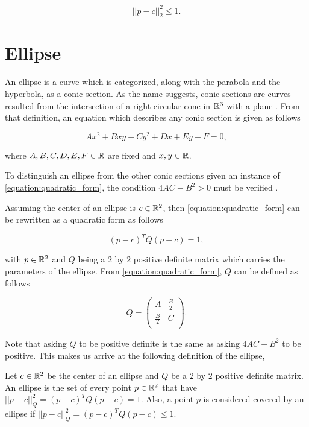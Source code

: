 \begin{equation}\label{eq:disk}
||p-c||_2^2 \le 1.
\end{equation} 

\section{Ellipse}

An ellipse is a curve which is categorized, along with the parabola and the hyperbola, as a conic section. As the name suggests, conic sections are curves resulted from the intersection of a right circular cone in $\mathbb{R}^3$ with a plane \cite{brannan:geometry}. From that definition, an equation which describes any conic section is given as follows

\begin{equation}\label{equation:quadratic_form}
Ax^2 + Bxy + Cy^2 + Dx + Ey + F = 0,
\end{equation}

\noindent where $A,B,C,D,E,F \in \mathbb{R}$ are fixed and $x, y \in \mathbb{R}$.

To distinguish an ellipse from the other conic sections given an instance of \autoref{equation:quadratic_form}, the condition $4AC - B^2>0$ must be verified \cite{ayoub}.

Assuming the center of an ellipse is $c \in \mathbb{R}^2$, then \autoref{equation:quadratic_form} can be rewritten as a quadratic form as follows

\begin{equation}
(p-c)^{T}Q(p-c) = 1,
\end{equation}

\noindent with $p \in \mathbb{R}^2$ and $Q$ being a $2$ by $2$ positive definite matrix which carries the parameters of the ellipse. From \autoref{equation:quadratic_form}, $Q$ can be defined as follows

\[
Q=
\left( {\begin{array}{cc}
	A & \frac{B}{2} \\
	\frac{B}{2} & C \\
	\end{array} } \right).
\]

Note that asking $Q$ to be positive definite is the same as asking $4AC-B^2$ to be positive. This makes us arrive at the following definition of the ellipse,

\begin{definicao}\label{def:ellipse}
    Let $c\in \mathbb{R}^2$ be the center of an ellipse and $Q$ be a $2$ by $2$ positive definite matrix. An ellipse is the set of every point $p \in \mathbb{R}^2$ that have $||p-c||_{Q}^2 = (p-c)^{T}Q(p-c) = 1$. Also, a point $p$ is considered covered by an ellipse if $||p-c||_{Q}^2 = (p-c)^{T}Q(p-c) \le 1$.
\end{definicao}

